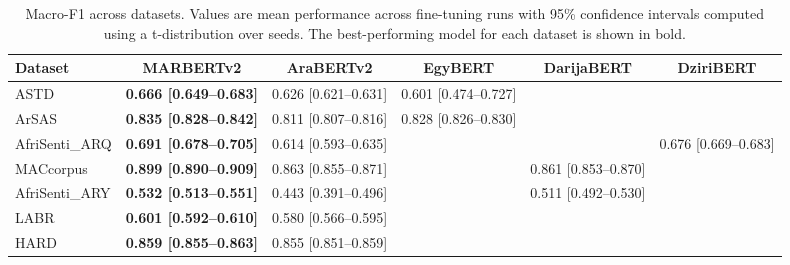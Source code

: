 \begin{table}[t]
\centering
\caption{Macro-F1 across datasets. Values are mean performance across fine-tuning runs with 95\% confidence intervals computed using a t-distribution over seeds. The best-performing model for each dataset is shown in bold.}
\label{tab:main_results}
\begin{tabular}{lccccc}
\toprule
Dataset & MARBERTv2 & AraBERTv2 & EgyBERT & DarijaBERT & DziriBERT \\
\midrule
ASTD & \textbf{0.666 [0.649--0.683]} & 0.626 [0.621--0.631] & 0.601 [0.474--0.727] & \textemdash{} & \textemdash{} \\
ArSAS & \textbf{0.835 [0.828--0.842]} & 0.811 [0.807--0.816] & 0.828 [0.826--0.830] & \textemdash{} & \textemdash{} \\
AfriSenti_ARQ & \textbf{0.691 [0.678--0.705]} & 0.614 [0.593--0.635] & \textemdash{} & \textemdash{} & 0.676 [0.669--0.683] \\
MACcorpus & \textbf{0.899 [0.890--0.909]} & 0.863 [0.855--0.871] & \textemdash{} & 0.861 [0.853--0.870] & \textemdash{} \\
AfriSenti_ARY & \textbf{0.532 [0.513--0.551]} & 0.443 [0.391--0.496] & \textemdash{} & 0.511 [0.492--0.530] & \textemdash{} \\
LABR & \textbf{0.601 [0.592--0.610]} & 0.580 [0.566--0.595] & \textemdash{} & \textemdash{} & \textemdash{} \\
HARD & \textbf{0.859 [0.855--0.863]} & 0.855 [0.851--0.859] & \textemdash{} & \textemdash{} & \textemdash{} \\
\bottomrule
\end{tabular}
\end{table}
